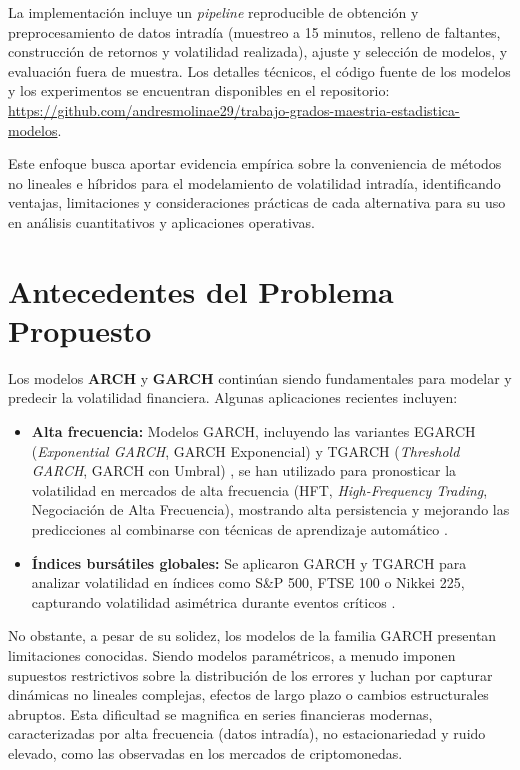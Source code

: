 \documentclass[12pt]{paper}
\begin{document}
La implementación incluye un \textit{pipeline} reproducible de obtención y preprocesamiento de datos intradía (muestreo a 15 minutos, relleno de faltantes, construcción de retornos y volatilidad realizada), ajuste y selección de modelos, y evaluación fuera de muestra. Los detalles técnicos, el código fuente de los modelos y los experimentos se encuentran disponibles en el repositorio: \url{https://github.com/andresmolinae29/trabajo-grados-maestria-estadistica-modelos}.

Este enfoque busca aportar evidencia empírica sobre la conveniencia de métodos no lineales e híbridos para el modelamiento de volatilidad intradía, identificando ventajas, limitaciones y consideraciones prácticas de cada alternativa para su uso en análisis cuantitativos y aplicaciones operativas.


\section{Antecedentes del Problema Propuesto}

Los modelos \textbf{ARCH} y \textbf{GARCH} continúan siendo fundamentales para modelar y predecir la volatilidad financiera. Algunas aplicaciones recientes incluyen:

\begin{itemize}
    \item \textbf{Alta frecuencia:} Modelos GARCH, incluyendo las variantes EGARCH (\textit{Exponential GARCH}, GARCH Exponencial) \cite{nelson1991egarch} y TGARCH (\textit{Threshold GARCH}, GARCH con Umbral) \cite{zakoian1994tgarch}, se han utilizado para pronosticar la volatilidad en mercados de alta frecuencia (HFT, \textit{High-Frequency Trading}, Negociación de Alta Frecuencia), mostrando alta persistencia y mejorando las predicciones al combinarse con técnicas de aprendizaje automático \cite{hft2024}.

    \item \textbf{Índices bursátiles globales:} Se aplicaron GARCH y TGARCH para analizar volatilidad en índices como S\&P 500, FTSE 100 o Nikkei 225, capturando volatilidad asimétrica durante eventos críticos \cite{marisetty2024}.

\end{itemize}

No obstante, a pesar de su solidez, los modelos de la familia GARCH presentan limitaciones conocidas. Siendo modelos paramétricos, a menudo imponen supuestos restrictivos sobre la distribución de los errores y luchan por capturar dinámicas no lineales complejas, efectos de largo plazo o cambios estructurales abruptos. Esta dificultad se magnifica en series financieras modernas, caracterizadas por alta frecuencia (datos intradía), no estacionariedad y ruido elevado, como las observadas en los mercados de criptomonedas.
\end{document}

